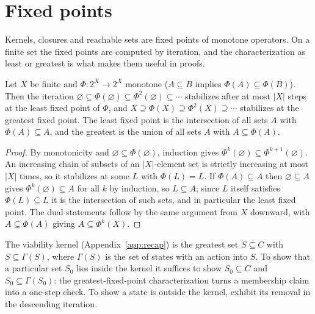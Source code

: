 \section{Fixed points}

Kernels, closures and reachable sets are fixed points of monotone operators. On a finite set the fixed points are computed by iteration, and the characterization as least or greatest is what makes them useful in proofs.

\begin{established}\label{pa:kt}
Let $X$ be finite and $\Phi:2^X\to2^X$ monotone ($A\subseteq B$ implies $\Phi(A)\subseteq\Phi(B)$). Then the iteration $\varnothing\subseteq\Phi(\varnothing)\subseteq\Phi^2(\varnothing)\subseteq\cdots$ stabilizes after at most $|X|$ steps at the least fixed point of $\Phi$, and $X\supseteq\Phi(X)\supseteq\Phi^2(X)\supseteq\cdots$ stabilizes at the greatest fixed point. The least fixed point is the intersection of all sets $A$ with $\Phi(A)\subseteq A$, and the greatest is the union of all sets $A$ with $A\subseteq\Phi(A)$.
\end{established}
\begin{proof}
By monotonicity and $\varnothing\subseteq\Phi(\varnothing)$, induction gives $\Phi^k(\varnothing)\subseteq\Phi^{k+1}(\varnothing)$. An increasing chain of subsets of an $|X|$-element set is strictly increasing at most $|X|$ times, so it stabilizes at some $L$ with $\Phi(L)=L$. If $\Phi(A)\subseteq A$ then $\varnothing\subseteq A$ gives $\Phi^k(\varnothing)\subseteq A$ for all $k$ by induction, so $L\subseteq A$; since $L$ itself satisfies $\Phi(L)\subseteq L$ it is the intersection of such sets, and in particular the least fixed point. The dual statements follow by the same argument from $X$ downward, with $A\subseteq\Phi(A)$ giving $A\subseteq\Phi^k(X)$.
\end{proof}

\begin{example}\label{pa:ex-kernel}
The viability kernel (Appendix~\ref{app:recap}) is the greatest set $S\subseteq C$ with $S\subseteq\Gamma(S)$, where $\Gamma(S)$ is the set of states with an action into $S$. To show that a particular set $S_0$ lies inside the kernel it suffices to show $S_0\subseteq C$ and $S_0\subseteq\Gamma(S_0)$: the greatest-fixed-point characterization turns a membership claim into a one-step check. To show a state is outside the kernel, exhibit its removal in the descending iteration.
\end{example}

